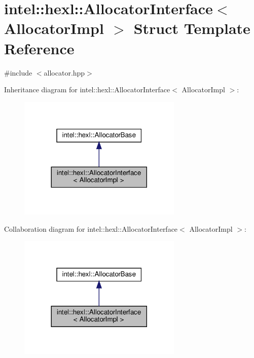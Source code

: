 \hypertarget{structintel_1_1hexl_1_1AllocatorInterface}{}\section{intel\+:\+:hexl\+:\+:Allocator\+Interface$<$ Allocator\+Impl $>$ Struct Template Reference}
\label{structintel_1_1hexl_1_1AllocatorInterface}


{\ttfamily \#include $<$allocator.\+hpp$>$}



Inheritance diagram for intel\+:\+:hexl\+:\+:Allocator\+Interface$<$ Allocator\+Impl $>$\+:
\nopagebreak
\begin{figure}[H]
\begin{center}
\leavevmode
\includegraphics[width=221pt]{structintel_1_1hexl_1_1AllocatorInterface__inherit__graph}
\end{center}
\end{figure}


Collaboration diagram for intel\+:\+:hexl\+:\+:Allocator\+Interface$<$ Allocator\+Impl $>$\+:
\nopagebreak
\begin{figure}[H]
\begin{center}
\leavevmode
\includegraphics[width=221pt]{structintel_1_1hexl_1_1AllocatorInterface__coll__graph}
\end{center}
\end{figure}
